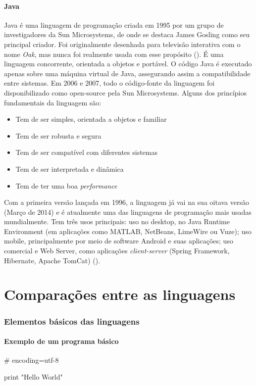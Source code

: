 \documentclass[11pt,openright,twoside]{report}
\begin{document}
\subsubsection{Java}
Java é uma linguagem de programação criada em 1995 por um grupo de investigadores da Sun Microsystems, de onde se destaca James Gosling como seu principal criador. Foi originalmente desenhada para televisão interativa com o nome \textit{Oak}, mas nunca foi realmente usada com esse propósito (\cite{Java}). É uma linguagem concorrente, orientada a objetos e portável. O código Java é executado apenas sobre uma máquina virtual de Java, assegurando assim a compatibilidade entre sistemas. Em 2006 e 2007, todo o código-fonte da linguagem foi disponibilizado como open-source pela Sun Microsystems. Alguns dos princípios fundamentais da linguagem são:
\begin{itemize}
  \item Tem de ser simples, orientada a objetos e familiar
  \item Tem de ser robusta e segura
  \item Tem de ser compatível com diferentes sistemas
  \item Tem de ser interpretada e dinâmica
  \item Tem de ter uma boa \textit{performance}
\end{itemize}
Com a primeira versão lançada em 1996, a linguagem já vai na sua oitava versão (Março de 2014) e é atualmente uma das linguagens de programação mais usadas mundialmente. Tem três usos principais: uso no desktop, no Java Runtime Environment (em aplicações como MATLAB, NetBeans, LimeWire ou Vuze); uso mobile, principalmente por meio de software Android e suas aplicações; uso comercial e Web Server, como aplicações \textit{client-server} (Spring Framework, Hibernate, Apache TomCat) (\cite{Java}).

\chapter{Comparações entre as linguagens}

\subsection{Elementos básicos das linguagens}

\subsubsection{Exemplo de um programa básico}
\smallskip
\begin{Python}
# encoding=utf-8

print "Hello World"
\end{Python}
\smallskip
\end{document}
